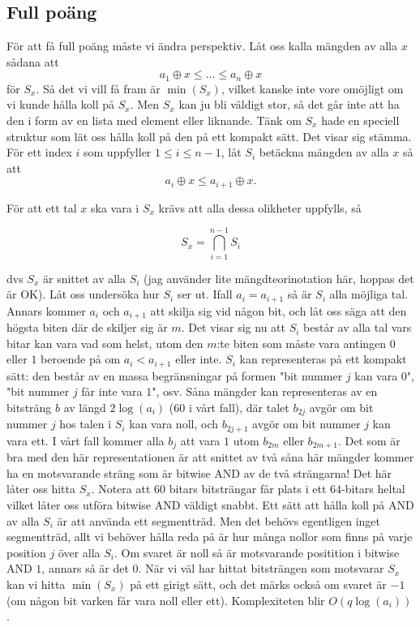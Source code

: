 \documentclass{article}
\begin{document}
\subsection*{Full poäng}

För att få full poäng måste vi ändra perspektiv. Låt oss kalla mängden av alla $x$ sådana att
$$a_1 \oplus x \leq \dots \leq a_n \oplus x$$
för $S_x$. Så det vi vill få fram är $\min(S_x)$, vilket kanske inte vore omöjligt om vi kunde hålla koll på $S_x$. Men $S_x$ kan ju bli väldigt stor, så det går inte att ha den i form av en lista med element eller liknande. Tänk om $S_x$ hade en speciell struktur som lät oss hålla koll på den på ett kompakt sätt. Det visar sig stämma. För ett index $i$ som uppfyller $1 \leq i \leq n-1$, låt $S_i$ betäckna mängden av alla $x$ så att 
$$a_i \oplus x \leq a_{i+1} \oplus x.$$

För att ett tal $x$ ska vara i $S_x$ krävs att alla dessa olikheter uppfylls, så

$$S_x = \bigcap_{i = 1}^{n-1}S_i$$

dvs $S_x$ är snittet av alla $S_i$ (jag använder lite mängdteorinotation här, hoppas det är OK). Låt oss undersöka hur $S_i$ ser ut. Ifall $a_i = a_{i+1}$ så är $S_i$ alla möjliga tal. Annars kommer $a_i$ och $a_{i+1}$ att skilja sig vid någon bit, och låt oss säga att den högsta biten där de skiljer sig är $m$. Det visar sig nu att $S_i$ består av alla tal vars bitar kan vara vad som helst, utom den $m$:te biten som måste vara antingen $0$ eller $1$ beroende på om $a_i < a_{i+1}$ eller inte. $S_i$ kan representeras på ett kompakt sätt: den består av en massa begränsningar på formen "bit nummer $j$ kan vara $0$", "bit nummer $j$ får inte vara $1$", osv. Såna mängder kan representeras av en bitsträng $b$ av längd $2\log(a_i)$ ($60$ i vårt fall), där talet $b_{2j}$ avgör om bit nummer $j$ hos talen i $S_i$ kan vara noll, och $b_{2j+1}$ avgör om bit nummer $j$ kan vara ett. I vårt fall kommer alla $b_j$ att vara $1$ utom $b_{2m}$ eller $b_{2m+1}$. Det som är bra med den här representationen är att snittet av två såna här mängder kommer ha en motsvarande sträng som är bitwise AND av de två strängarna! Det här låter oss hitta $S_x$. Notera att $60$ bitars bitsträngar får plats i ett $64$-bitars heltal vilket låter oss utföra bitwise AND väldigt snabbt. Ett sätt att hålla koll på AND av alla $S_i$ är att använda ett segmentträd. Men det behövs egentligen inget segmentträd, allt vi behöver hålla reda på är hur många nollor som finns på varje position $j$ över alla $S_i$. Om svaret är noll så är motsvarande positition i bitwise AND $1$, annars så är det $0$. När vi väl har hittat bitsträngen som motsvarar $S_x$ kan vi hitta $\min(S_x)$ på ett girigt sätt, och det märks också om svaret är $-1$ (om någon bit varken får vara noll eller ett). Komplexiteten blir $O(q\log(a_i))$.
\end{document}

